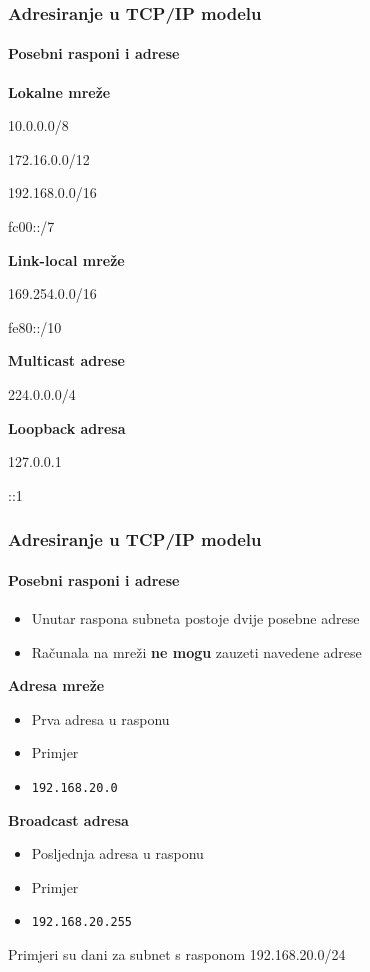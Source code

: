 \documentclass[t,table,usenames,dvipsnames]{beamer}
\begin{document}
\begin{frame}
	\frametitle{Adresiranje u TCP/IP modelu}
	\framesubtitle{Posebni rasponi i adrese}
	\begin{minipage}[t]{0.45\linewidth}
	\textbf{Lokalne mreže}
	\begin{itemize}
		{\ttfamily
			\item[] 10.0.0.0/8
			\item[] 172.16.0.0/12
			\item[] 192.168.0.0/16
			\item[] fc00::/7
		}
	\end{itemize}
	\end{minipage}
	\begin{minipage}[t]{0.45\linewidth}
	\textbf{Link-local mreže}
	\begin{itemize}
		{\ttfamily
			\item[] 169.254.0.0/16
			\item[] fe80::/10
		}
	\end{itemize}
	\end{minipage}
	\vfill 
	\textbf{Multicast adrese}
	\begin{itemize}
		{\ttfamily 
			\item[] 224.0.0.0/4
		}
	\end{itemize}
	\textbf{Loopback adresa}
	\begin{itemize}
		{\ttfamily
			\item[] 127.0.0.1
			\item[] ::1
		}
	\end{itemize}
\end{frame}

\begin{frame}
	\frametitle{Adresiranje u TCP/IP modelu}
	\framesubtitle{Posebni rasponi i adrese}
	\begin{itemize}
		\item Unutar raspona subneta postoje dvije posebne adrese
		\item Računala na mreži \textbf{ne mogu} zauzeti navedene adrese
	\end{itemize}
	\vfill
	\textbf{Adresa mreže}
	\begin{itemize}
		\item Prva adresa u rasponu
		\item Primjer
		\item[] \texttt{192.168.20.0}
	\end{itemize}
	\textbf{Broadcast adresa}
	\begin{itemize}
		\item Posljednja adresa u rasponu
		\item Primjer
		\item[] \texttt{192.168.20.255}
	\end{itemize}
	{\small Primjeri su dani za subnet s rasponom 192.168.20.0/24}
\end{frame}
\end{document}
